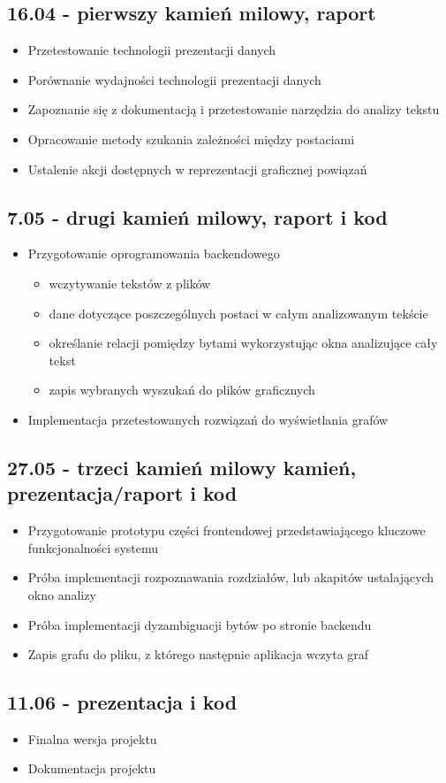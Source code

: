 \documentclass[12pt,a4paper]{article} %
\begin{document}
    \subsection{16.04 - pierwszy kamień milowy, raport}
        \begin{itemize}
            \item Przetestowanie technologii prezentacji danych
            \item Porównanie wydajności technologii prezentacji danych
            \item Zapoznanie się z dokumentacją i przetestowanie narzędzia do analizy tekstu
            \item Opracowanie metody szukania zależności między postaciami
            \item Ustalenie akcji dostępnych w reprezentacji graficznej powiązań
        \end{itemize}

    \subsection{7.05 - drugi kamień milowy, raport i kod}
        \begin{itemize}
            \item Przygotowanie oprogramowania backendowego
                \begin{itemize}
                    \item wczytywanie tekstów z plików
                    \item dane dotyczące poszczególnych postaci w całym analizowanym tekście
                    \item określanie relacji pomiędzy bytami wykorzystując okna analizujące cały tekst
                    \item zapis wybranych wyszukań do plików graficznych
                \end{itemize}{}
            \item Implementacja przetestowanych rozwiązań do wyświetlania grafów
        \end{itemize}

    \subsection{27.05 - trzeci kamień milowy kamień, prezentacja/raport i kod}
        \begin{itemize}
            \item Przygotowanie prototypu części frontendowej przedstawiającego kluczowe funkcjonalności systemu
            \item Próba implementacji rozpoznawania rozdziałów, lub akapitów ustalających okno analizy
            \item Próba implementacji dyzambiguacji bytów po stronie backendu
            \item Zapis grafu do pliku, z którego następnie aplikacja wczyta graf
        \end{itemize}

    \subsection{11.06 - prezentacja i kod}
        \begin{itemize}
            \item Finalna wersja projektu
            \item Dokumentacja projektu
        \end{itemize}
\end{document}
